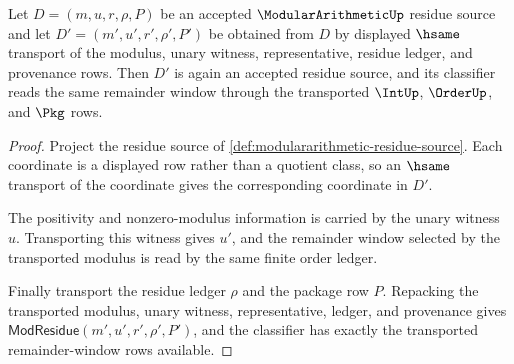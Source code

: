 \begin{theorem}
\label{thm:modulararithmetic-residue-carrier-stability}
Let $D=(m,u,r,\rho,P)$ be an accepted $\ModularArithmeticUp$ residue source and let $D'=(m',u',r',\rho',P')$ be obtained from $D$ by displayed $\hsame$ transport of the modulus, unary witness, representative, residue ledger, and provenance rows. Then $D'$ is again an accepted residue source, and its classifier reads the same remainder window through the transported $\IntUp$, $\OrderUp$, and $\Pkg$ rows.
\end{theorem}
\begin{proof}
Project the residue source of \autoref{def:modulararithmetic-residue-source}. Each coordinate is a displayed row rather than a quotient class, so an $\hsame$ transport of the coordinate gives the corresponding coordinate in $D'$.

The positivity and nonzero-modulus information is carried by the unary witness $u$. Transporting this witness gives $u'$, and the remainder window selected by the transported modulus is read by the same finite order ledger.

Finally transport the residue ledger $\rho$ and the package row $P$. Repacking the transported modulus, unary witness, representative, ledger, and provenance gives $\mathsf{ModResidue}(m',u',r',\rho',P')$, and the classifier has exactly the transported remainder-window rows available.
\end{proof}

